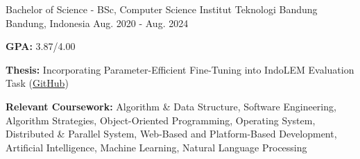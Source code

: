 

\begin{cventries}

  \cventry
    {Bachelor of Science - BSc, Computer Science} %
    {Institut Teknologi Bandung} %
    {Bandung, Indonesia} %
    {Aug. 2020 - Aug. 2024} %
    {
      \begin{cvitems} %
        \item {\textbf{GPA:} 3.87/4.00}
        \item {\textbf{Thesis:} Incorporating Parameter-Efficient Fine-Tuning into IndoLEM Evaluation Task (\href{https://github.com/apwic/indolem-peft}{GitHub})}
        \item {\textbf{Relevant Coursework:} Algorithm \& Data Structure, Software Engineering, Algorithm Strategies, Object-Oriented Programming, Operating System, Distributed \& Parallel System, Web-Based and Platform-Based Development, Artificial Intelligence, Machine Learning, Natural Language Processing}
      \end{cvitems}
    }

\end{cventries}
